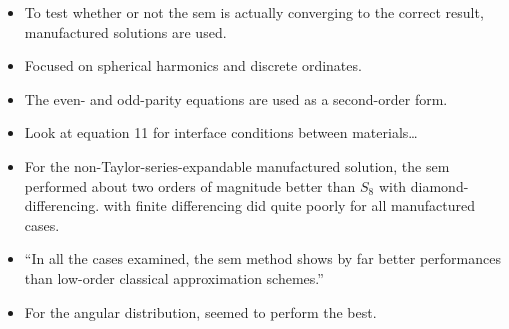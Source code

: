 \begin{itemize}
  \item To test whether or not the \gls{sem} is actually converging to the correct result, manufactured solutions are used.
  \item Focused on spherical harmonics and discrete ordinates.
  \item The even- and odd-parity equations are used as a second-order form.
  \item Look at equation 11 for interface conditions between materials\dots
  \item For the non-Taylor-series-expandable manufactured solution, the \gls{sem} performed about two orders of magnitude better than $S_8$ with diamond-differencing. \Pn with finite differencing did quite poorly for all manufactured cases.
  \item ``In all the cases examined, the \gls{sem} method shows by far better performances than low-order classical approximation schemes.''
  \item For the angular distribution, \Sn seemed to perform the best.
\end{itemize}